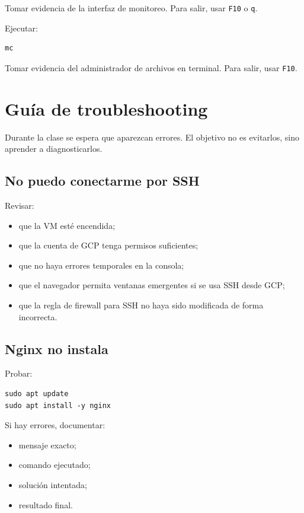 \documentclass[
  coursetitle={Cómputo Nube y Tecnologías Emergentes},
  coursehours={96},
  coursedate={Verano 2026},
  doctype={Práctica},
  otherlangs={english,french},
  authorname={Lázaro},
  authorsurname={Bustio-Martínez},
  authortitle={PhD},
  role={Profesor Investigador},
  email={lbustio@inaoe.mx},
  phone={5559504000},
  ext={7459},
  institution={Instituto Nacional de Astrofísica, Óptica y Electrónica (INAOE)},
  department={Maestría en Ciencias en Tecnologías de Seguridad},
  address={Luis Enrique Erro 1, Sta. Ma. Tonantzintla, San Andrés Cholula, CP 72840, Puebla, México},
  margin={0.5in}
]{../../lbustio_lecture_notes}
\begin{document}
Tomar evidencia de la interfaz de monitoreo. Para salir, usar \texttt{F10} o \texttt{q}.

Ejecutar:

\begin{lstlisting}
mc
\end{lstlisting}

Tomar evidencia del administrador de archivos en terminal. Para salir, usar \texttt{F10}.

\section{Guía de troubleshooting}

Durante la clase se espera que aparezcan errores. El objetivo no es evitarlos, sino aprender a diagnosticarlos.

\subsection{No puedo conectarme por SSH}

Revisar:

\begin{itemize}
    \item que la VM esté encendida;
    \item que la cuenta de GCP tenga permisos suficientes;
    \item que no haya errores temporales en la consola;
    \item que el navegador permita ventanas emergentes si se usa SSH desde GCP;
    \item que la regla de firewall para SSH no haya sido modificada de forma incorrecta.
\end{itemize}

\subsection{Nginx no instala}

Probar:

\begin{lstlisting}
sudo apt update
sudo apt install -y nginx
\end{lstlisting}

Si hay errores, documentar:

\begin{itemize}
    \item mensaje exacto;
    \item comando ejecutado;
    \item solución intentada;
    \item resultado final.
\end{itemize}
\end{document}
